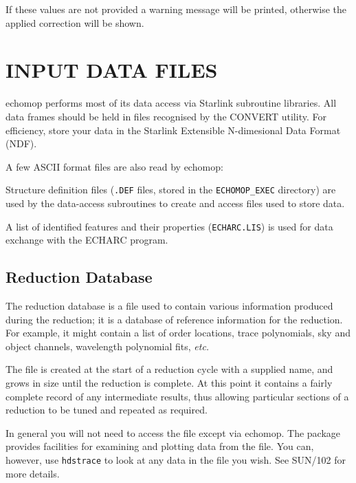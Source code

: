 \documentclass[11pt,twoside]{article}
\newcommand{\stardocinitials}  {SUN}
\newcommand{\stardocnumber}    {152.4}
\newcommand{\stardocname}{\stardocinitials /\stardocnumber}
\newcommand{\xref}[3]{#1}
\newcommand{\xlabel}[1]{}
\newcommand{\mlabel}[1]{\xlabel{#1}\label{#1}}
\newcommand{\myindex}[1]{\index{#1}}
\renewcommand{\myindex}[1]{}
\begin{document}
If these values are not provided a warning message will be printed,
otherwise the applied correction will be shown.


\section{\mlabel{input_files}INPUT DATA FILES}
\markboth{INPUT DATA FILES}{\stardocname}
\myindex{Input data files}

{\sc echomop} performs most of its data access via Starlink subroutine
libraries.
All data frames should be held in files recognised by the \xref{{\sc
CONVERT}}{sun55}{} utility.  For efficiency, store your data in the
Starlink Extensible N-dimesional Data Format (\xref{NDF}{sun33}{}).

A few ASCII format files are also read by {\sc echomop}:

Structure definition files (\texttt{.DEF} files, stored in the
\texttt{ECHOMOP\_EXEC} directory) are used by the data-access subroutines
to create and access files used to store data.

A list of identified features and their properties (\texttt{ECHARC.LIS})
is used for data
exchange with the \xref{ECHARC}{sun86}{ECHARC} program.


\subsection{\mlabel{reduction_file}\mlabel{reduction_database}Reduction
            Database}
\myindex{Reduction database}

The reduction database is a file used to contain
various information produced during the reduction;
it is a database of reference information for the reduction.
For example, it might contain a list of order locations,
trace polynomials, sky and object channels, wavelength polynomial fits,
{\it etc.}

The file is created at the start of a reduction cycle with a supplied name,
and grows in size until the reduction is complete.
At this point it contains a fairly complete record of any intermediate
results, thus allowing particular sections of a reduction to be tuned
and repeated as required.

In general you will not need to access the file except via {\sc echomop}.
The package provides facilities for examining and plotting data from the file.
You can, however, use \texttt{hdstrace} to look at any data in the file you wish.
See \xref{SUN/102}{sun102}{} for more details.
\end{document}
